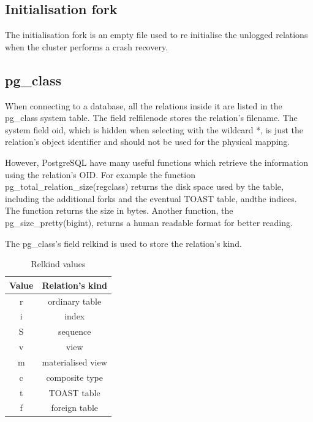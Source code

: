 \subsection{Initialisation fork}
The initialisation fork is an empty file used to re initialise the unlogged relations 
when the cluster performs a crash recovery.

\subsection{pg\_class}
When connecting to a database, all the relations inside it are listed in the 
pg\_class system table. The field relfilenode stores the relation's 
filename. The system field oid, which is hidden when selecting with the wildcard *, is 
just the relation's object identifier and should not be used for the physical 
mapping.\newline

However, PostgreSQL have many useful functions which retrieve the information 
using the relation's OID. For example the function pg\_total\_relation\_size(regclass) 
returns the disk space used by the table, including the additional forks and the eventual 
TOAST table, andthe indices. The function returns the size in bytes. Another function, 
the pg\_size\_pretty(bigint), returns a human readable format for better reading.\newline

The pg\_class's field relkind is used to store the relation's kind.

\begin{table}[h]
  \begin{tabular}{cc}
    Value & Relation's kind\\
    \hline
    r  &  ordinary table \\
    i  &  index \\
    S  &  sequence \\
    v  &  view \\
    m  &  materialised view \\
    c  &  composite type \\
    t  &  TOAST table \\
    f  &  foreign table \\
    
  \end{tabular}
  \caption{\label{tab:RELKIND}Relkind values}
\end{table}

